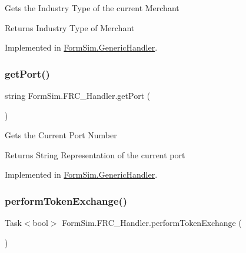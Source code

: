 Gets the Industry Type of the current Merchant 

\begin{DoxyReturn}{Returns}
Industry Type of Merchant
\end{DoxyReturn}


Implemented in \mbox{\hyperlink{class_form_sim_1_1_generic_handler_a9bef42bcd6992d96947612aaab8f88a7}{Form\+Sim.\+Generic\+Handler}}.

\mbox{\label{interface_form_sim_1_1_f_r_c___handler_add0725551d06bb4cfb33c23bef426814}} 
\subsubsection{\texorpdfstring{get\+Port()}{getPort()}}
{\footnotesize\ttfamily string Form\+Sim.\+F\+R\+C\+\_\+\+Handler.\+get\+Port (\begin{DoxyParamCaption}{ }\end{DoxyParamCaption})}



Gets the Current Port Number 

\begin{DoxyReturn}{Returns}
String Representation of the current port
\end{DoxyReturn}


Implemented in \mbox{\hyperlink{class_form_sim_1_1_generic_handler_a0e6f8152a789ba9f82501d45b029de71}{Form\+Sim.\+Generic\+Handler}}.

\mbox{\label{interface_form_sim_1_1_f_r_c___handler_a32c299d3cb3cdd6c444e76b3671af1b4}} 
\subsubsection{\texorpdfstring{perform\+Token\+Exchange()}{performTokenExchange()}}
{\footnotesize\ttfamily Task$<$bool$>$ Form\+Sim.\+F\+R\+C\+\_\+\+Handler.\+perform\+Token\+Exchange (\begin{DoxyParamCaption}{ }\end{DoxyParamCaption})}



